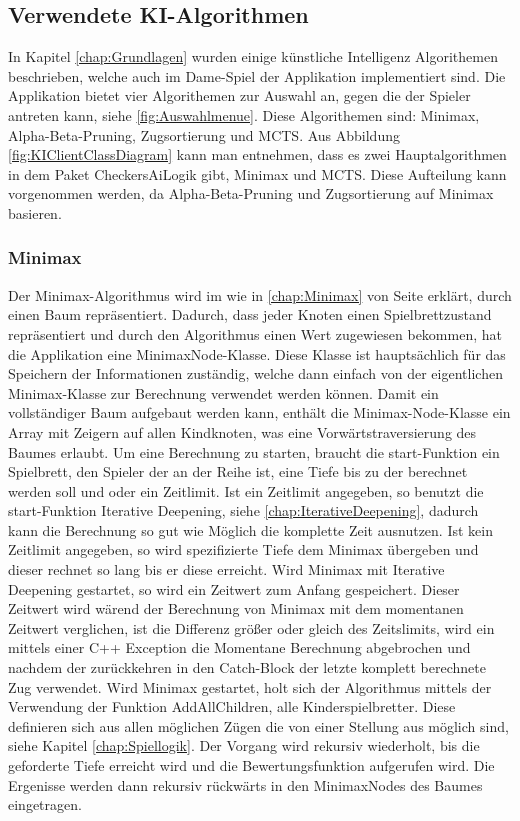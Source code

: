 \documentclass[12pt,a4paper,bibliography=totocnumbered,listof=totocnumbered]{article}
\begin{document}
\subsection{Verwendete KI-Algorithmen}
\label{chap:KIAlgorithms}
In Kapitel \ref{chap:Grundlagen} wurden einige künstliche Intelligenz Algorithemen beschrieben, welche auch im Dame-Spiel der Applikation implementiert sind.
Die Applikation bietet vier Algorithemen zur Auswahl an, gegen die der Spieler antreten kann, siehe \ref{fig:Auswahlmenue}. 
Diese Algorithemen sind: Minimax, Alpha-Beta-Pruning, Zugsortierung und MCTS.
Aus Abbildung \ref{fig:KIClientClassDiagram}
kann man entnehmen, dass es zwei Hauptalgorithmen in dem Paket CheckersAiLogik gibt, Minimax und MCTS. Diese Aufteilung kann vorgenommen werden,
da Alpha-Beta-Pruning und Zugsortierung auf Minimax basieren.


\subsubsection{Minimax}
Der Minimax-Algorithmus wird im wie in \ref{chap:Minimax} von Seite \pageref{chap:Minimax} erklärt, durch einen Baum repräsentiert. Dadurch, dass jeder Knoten einen Spielbrettzustand
repräsentiert und durch den Algorithmus einen Wert zugewiesen bekommen, hat die Applikation eine MinimaxNode-Klasse.
Diese Klasse ist hauptsächlich für das Speichern der Informationen zuständig, welche dann einfach von der eigentlichen Minimax-Klasse zur Berechnung
verwendet werden können. Damit ein vollständiger Baum aufgebaut werden kann, enthält die Minimax-Node-Klasse ein Array mit Zeigern auf allen 
Kindknoten, was eine Vorwärtstraversierung des Baumes erlaubt. 
Um eine Berechnung zu starten, braucht die start-Funktion ein Spielbrett, den Spieler der an der Reihe ist, eine
Tiefe bis zu der berechnet werden soll und oder ein Zeitlimit. Ist ein Zeitlimit angegeben, so benutzt die start-Funktion Iterative Deepening, siehe
\ref{chap:IterativeDeepening}, dadurch kann die Berechnung so gut wie Möglich die komplette Zeit ausnutzen. Ist kein Zeitlimit angegeben, 
so wird spezifizierte Tiefe dem Minimax übergeben und dieser rechnet so lang bis er diese erreicht. Wird Minimax mit Iterative Deepening gestartet, so
wird ein Zeitwert zum Anfang gespeichert. Dieser Zeitwert wird wärend der Berechnung von Minimax mit dem momentanen Zeitwert verglichen, ist die 
Differenz größer oder gleich des Zeitslimits, wird ein mittels einer C++ Exception die Momentane Berechnung abgebrochen und nachdem der zurückkehren in 
den Catch-Block der letzte komplett berechnete Zug verwendet. 
Wird Minimax gestartet, holt sich der Algorithmus mittels der Verwendung der Funktion AddAllChildren, alle Kinderspielbretter. Diese 
definieren sich aus allen möglichen Zügen die von einer Stellung aus möglich sind, siehe Kapitel \ref{chap:Spiellogik}. Der Vorgang wird 
rekursiv wiederholt, bis die geforderte Tiefe erreicht wird und die Bewertungsfunktion aufgerufen wird. Die Ergenisse werden dann rekursiv rückwärts in 
den MinimaxNodes des Baumes eingetragen.
\end{document}
